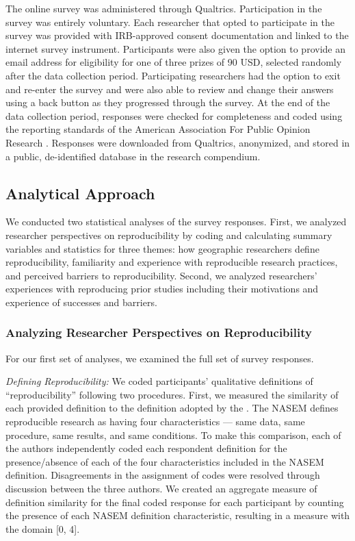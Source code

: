 \documentclass[]{interact}
\newcommand{\citep}{\parencite}
\theoremstyle{plain}%
\theoremstyle{definition}
\theoremstyle{remark}
\begin{document}
The online survey was administered through Qualtrics. 
Participation in the survey was entirely voluntary. 
Each researcher that opted to participate in the survey was provided with IRB-approved consent documentation and linked to the internet survey instrument. 
Participants were also given the option to provide an email address for eligibility for one of three  prizes of 90 USD, selected randomly after the data collection period.
Participating researchers had the option to exit and re-enter the survey and were also able to review and change their answers using a back button as they progressed through the survey.
At the end of the data collection period, responses were checked for completeness and coded using the reporting standards of the American Association For Public Opinion Research \citep{aaporstandards}.
Responses were downloaded from Qualtrics, anonymized, and stored in a public, de-identified database in the research compendium.

\subsection*{Analytical Approach}

We conducted two statistical analyses of the survey responses.
First, we analyzed researcher perspectives on reproducibility by coding and calculating summary variables and statistics for three themes: how geographic researchers define reproducibility, familiarity and experience with reproducible research practices, and perceived barriers to reproducibility.
Second, we analyzed researchers' experiences with reproducing prior studies including their motivations and experience of successes and barriers.

\subsubsection*{Analyzing Researcher Perspectives on Reproducibility}

\noindent For our first set of analyses, we examined the full set of survey responses.

\textit{Defining Reproducibility:} 
We coded participants' qualitative definitions of ``reproducibility'' following two procedures.
First, we measured the similarity of each provided definition to the definition adopted by the \textcite{NASEM2019}. 
The NASEM defines reproducible research as having four characteristics --- same data, same procedure, same results, and same conditions.
To make this comparison, each of the authors independently coded each respondent definition for the presence/absence of each of the four characteristics included in the NASEM definition.
Disagreements in the assignment of codes were resolved through discussion between the three authors.
We created an aggregate measure of definition similarity for the final coded response for each participant by counting the presence of each NASEM definition characteristic, resulting in a measure with the domain [0, 4].
\end{document}
